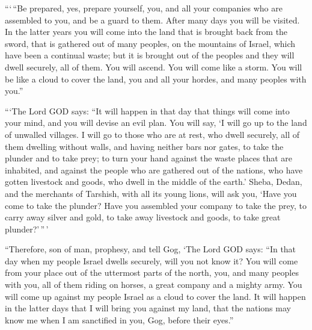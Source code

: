  ```\,``Be prepared, yes, prepare yourself, you, and all
your companies who are assembled to you, and be a guard to them.
 After many days you will be visited. In the latter years
you will come into the land that is brought back from the sword, that is
gathered out of many peoples, on the mountains of Israel, which have
been a continual waste; but it is brought out of the peoples and they
will dwell securely, all of them.  You will ascend. You will
come like a storm. You will be like a cloud to cover the land, you and
all your hordes, and many peoples with you.''

 ```The Lord GOD says: ``It will happen in that day that
things will come into your mind, and you will devise an evil plan.
 You will say, `I will go up to the land of unwalled
villages. I will go to those who are at rest, who dwell securely, all of
them dwelling without walls, and having neither bars nor gates,
 to take the plunder and to take prey; to turn your hand
against the waste places that are inhabited, and against the people who
are gathered out of the nations, who have gotten livestock and goods,
who dwell in the middle of the earth.'  Sheba, Dedan, and
the merchants of Tarshish, with all its young lions, will ask you, `Have
you come to take the plunder? Have you assembled your company to take
the prey, to carry away silver and gold, to take away livestock and
goods, to take great plunder?'\,''\,'

 ``Therefore, son of man, prophesy, and tell Gog, `The Lord
GOD says: ``In that day when my people Israel dwells securely, will you
not know it?  You will come from your place out of the
uttermost parts of the north, you, and many peoples with you, all of
them riding on horses, a great company and a mighty army. 
You will come up against my people Israel as a cloud to cover the land.
It will happen in the latter days that I will bring you against my land,
that the nations may know me when I am sanctified in you, Gog, before
their eyes.''

